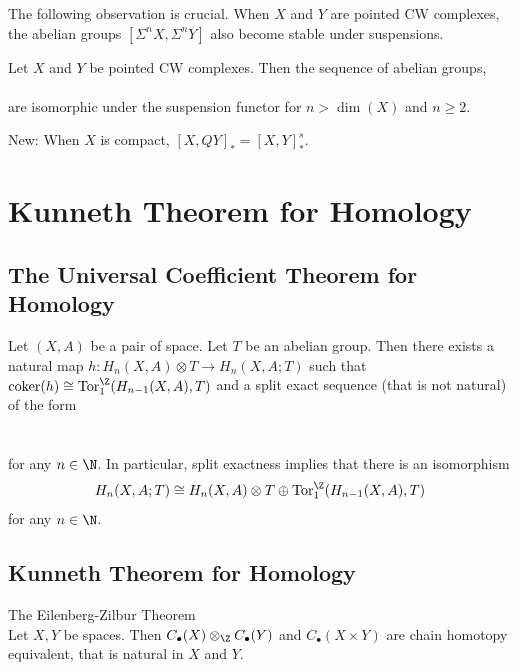 \documentclass[a4paper]{article}
\begin{document}
The following observation is crucial. When $X$ and $Y$ are pointed CW complexes, the abelian groups $[\Sigma^n X,\Sigma^n Y]$ also become stable under suspensions. 

\begin{thm}{}{} Let $X$ and $Y$ be pointed CW complexes. Then the sequence of abelian groups, \\
\\
are isomorphic under the suspension functor for $n>\dim(X)$ and $n\geq 2$. 
\end{thm}

New: When $X$ is compact, $[X,QY]_\ast=[X,Y]_\ast^s$. 


\pagebreak
\section{Kunneth Theorem for Homology}
\subsection{The Universal Coefficient Theorem for Homology}
\begin{prp}{}{} Let $(X,A)$ be a pair of space. Let $T$ be an abelian group. Then there exists a natural map $h:H_n(X,A)\otimes T\to H_n(X,A;T)$ such that $\text{coker}(h)\cong\text{Tor}_1^\Z(H_{n-1}(X,A),T)$ and a split exact sequence (that is not natural) of the form \\~\\
\\
for any $n\in\N$. In particular, split exactness implies that there is an isomorphism $$H_n(X,A;T)\cong H_n(X,A)\otimes T\oplus\text{Tor}_1^\Z(H_{n-1}(X,A),T)$$ for any $n\in\N$. 
\end{prp}

\subsection{Kunneth Theorem for Homology}
\begin{thm}{The Eilenberg-Zilbur Theorem}{}\\
Let $X,Y$ be spaces. Then $C_\bullet(X)\otimes_\Z C_\bullet(Y)$ and $C_\bullet(X\times Y)$ are chain homotopy equivalent, that is natural in $X$ and $Y$. 
\end{thm}
\end{document}

